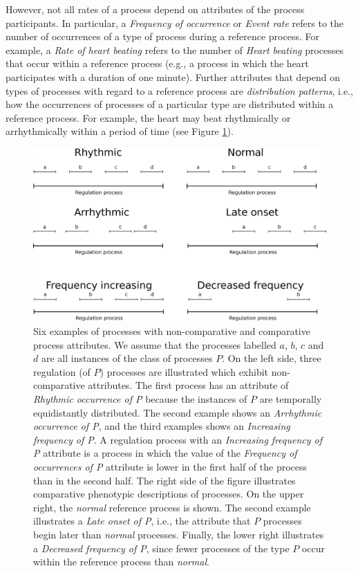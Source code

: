 \documentclass{bioinfo}
\begin{document}
However, not all rates of a process depend on attributes of the
process participants. In particular, a {\em Frequency of occurrence}
or {\em Event rate} refers to the number of occurrences of a type of
process during a reference process. For example, a {\em Rate of heart
  beating} refers to the number of {\em Heart beating} processes that
occur within a reference process (e.g., a process in which the heart
participates with a duration of one minute). Further attributes that
depend on types of processes with regard to a reference process are
{\em distribution patterns}, i.e., how the occurrences of processes of
a particular type are distributed within a reference process. For
example, the heart may beat rhythmically or arrhythmically within a
period of time (see Figure \ref{fig:patterns}).
\begin{figure}
  \centering
  \includegraphics[width=.5\textwidth]{processpatterns.eps}
  \caption{\label{fig:patterns}Six examples of processes with
    non-comparative and comparative process attributes.  We assume
    that the processes labelled $a$, $b$, $c$ and $d$ are all
    instances of the class of processes $P$.  On the left side, three
    regulation (of $P$) processes are illustrated which exhibit
    non-comparative attributes. The first process has an attribute of
    {\em Rhythmic occurrence of P} because the instances of $P$ are
    temporally equidistantly distributed. The second example shows an
    {\em Arrhythmic occurrence of P}, and the third examples shows an
    {\em Increasing frequency of P}. A regulation process with an {\em
      Increasing frequency of P} attribute is a process in which the
    value of the {\em Frequency of occurrences of P} attribute is
    lower in the first half of the process than in the second
    half. The right side of the figure illustrates comparative
    phenotypic descriptions of processes. On the upper right, the {\em
      normal} reference process is shown. The second example
    illustrates a {\em Late onset of P}, i.e., the attribute that $P$
    processes begin later than {\em normal} processes. Finally, the
    lower right illustrates a {\em Decreased frequency of P}, since
    fewer processes of the type $P$ occur within the reference process
    than {\em normal}.}
\end{figure}
\end{document}
